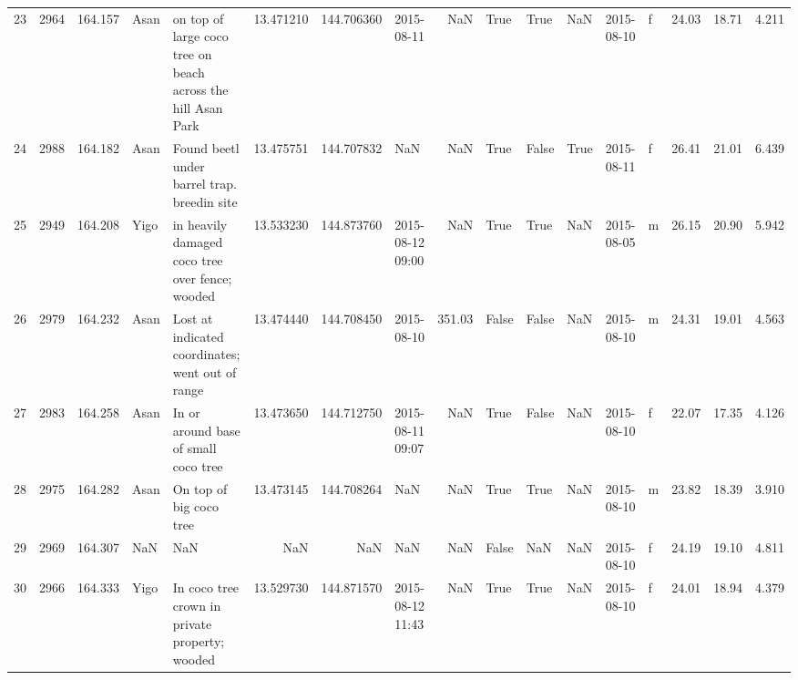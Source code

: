 \begin{tabular}{lrrllrrlrlllllrrr}
23 &       2964 &    164.157 &     Asan &                           on top of large coco tree on beach across the hill Asan Park &  13.471210 &  144.706360 &           2015-08-11 &                     NaN &              True &    True &           NaN &       2015-08-10 &   f &   24.03 &  18.71 &   4.211 \\
24 &       2988 &    164.182 &     Asan &                                            Found beetl under barrel trap. breedin site &  13.475751 &  144.707832 &                  NaN &                     NaN &              True &   False &          True &       2015-08-11 &   f &   26.41 &  21.01 &   6.439 \\
25 &       2949 &    164.208 &     Yigo &                                        in heavily damaged coco tree over fence; wooded &  13.533230 &  144.873760 &     2015-08-12 09:00 &                     NaN &              True &    True &           NaN &       2015-08-05 &   m &   26.15 &  20.90 &   5.942 \\
26 &       2979 &    164.232 &     Asan &                                       Lost at indicated coordinates; went out of range &  13.474440 &  144.708450 &           2015-08-10 &                  351.03 &             False &   False &           NaN &       2015-08-10 &   m &   24.31 &  19.01 &   4.563 \\
27 &       2983 &    164.258 &     Asan &                                                   In or around base of small coco tree &  13.473650 &  144.712750 &     2015-08-11 09:07 &                     NaN &              True &   False &           NaN &       2015-08-10 &   f &   22.07 &  17.35 &   4.126 \\
28 &       2975 &    164.282 &     Asan &                                                                On top of big coco tree &  13.473145 &  144.708264 &                  NaN &                     NaN &              True &    True &           NaN &       2015-08-10 &   m &   23.82 &  18.39 &   3.910 \\
29 &       2969 &    164.307 &      NaN &                                                                                    NaN &        NaN &         NaN &                  NaN &                     NaN &             False &     NaN &           NaN &       2015-08-10 &   f &   24.19 &  19.10 &   4.811 \\
30 &       2966 &    164.333 &     Yigo &                                         In coco tree crown in private property; wooded &  13.529730 &  144.871570 &     2015-08-12 11:43 &                     NaN &              True &    True &           NaN &       2015-08-10 &   f &   24.01 &  18.94 &   4.379 \\

\end{tabular}
